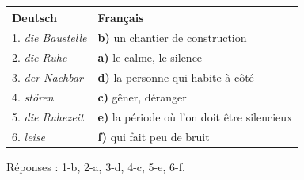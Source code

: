 \documentclass[11pt]{article}
\newcommand{\all}[1]{\ifmmode\text{\textit{#1}}\else\begingroup\selectlanguage{ngerman}\itshape #1\endgroup\fi}
\begin{document}
\begin{corrige}
\begin{center}
\begin{tabularx}{\linewidth}{|X|X|}
\hline
\rowcolor{popblueL} \textbf{Deutsch} & \textbf{Français} \\
\hline
1. \all{die Baustelle} & \textbf{b)} un chantier de construction \\
\hline
2. \all{die Ruhe} & \textbf{a)} le calme, le silence \\
\hline
3. \all{der Nachbar} & \textbf{d)} la personne qui habite à côté \\
\hline
4. \all{stören} & \textbf{c)} gêner, déranger \\
\hline
5. \all{die Ruhezeit} & \textbf{e)} la période où l'on doit être silencieux \\
\hline
6. \all{leise} & \textbf{f)} qui fait peu de bruit \\
\hline
\end{tabularx}
\end{center}
Réponses : 1-b, 2-a, 3-d, 4-c, 5-e, 6-f.
\end{corrige}
\end{document}

